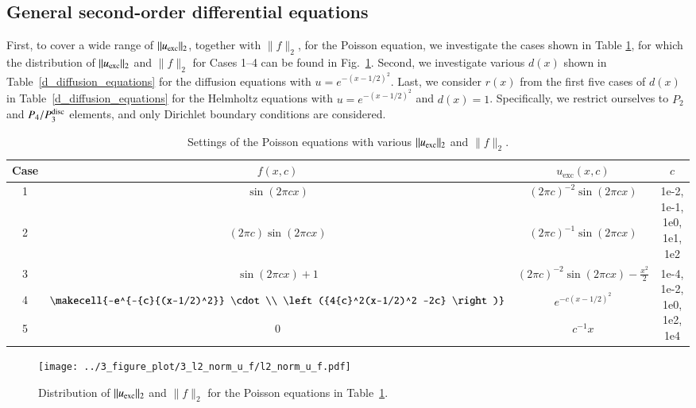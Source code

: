 \documentclass[review,3p]{elsarticle}
\begin{document}
\subsection{General second-order differential equations}	    \label{section_scaling}

First, to cover a wide range of $\|u_{\rm exc}\|_2$, together with $\|f\|_2$, for the Poisson equation, we investigate the cases shown in Table \ref{scaling_cases_Poisson}, for which the distribution of $\|u_{\rm exc}\|_2$ and $\|f\|_2$ for Cases 1--4 can be found in Fig.~\ref{l2_norm_u_f}. Second, we investigate various $d(x)$ shown in Table~\ref{d_diffusion_equations} for the diffusion equations with $u=e^{-{(x-1/2)^2}}$. Last, we consider $r(x)$ from the first five cases of $d(x)$ in Table~\ref{d_diffusion_equations} for the Helmholtz equations with $u=e^{-{(x-1/2)^2}}$ and $d(x)=1$. Specifically, we restrict ourselves to $P_2$ and $P_4/P_3^{\rm disc}$ elements, and only Dirichlet boundary conditions are considered. 

\begin{table}[!ht]
\centering
\caption [w]{Settings of the Poisson equations with various $\|u_{\rm exc}\|_2$ and $\|f\|_2$.} 
\label{scaling_cases_Poisson}
 \begin{tabular}{c c c c} \hline      
Case & $f(x,c)$ & $u_{\text{exc}}(x,c)$ & $c$ \\ \hline
1 & $\sin (2 \pi cx)$ & ${(2 \pi c)}^{-2} \sin (2 \pi cx)$ & \multirow{2}{*}{1e-2, 1e-1, 1e0, 1e1, 1e2} \\ \cline{1-3}
2 & $(2 \pi c) \sin (2 \pi c x)$ & ${(2 \pi c)}^{-1} \sin (2 \pi cx)$ &  \\ \hline
3 & $\sin (2 \pi c x) +1$ & ${(2 \pi c)}^{-2}\sin (2 \pi c x)-\frac{x^2}{2}$ & \multirow{4}{*}{1e-4, 1e-2, 1e0, 1e2, 1e4} \\ \cline{1-3}
4 & $\makecell{-e^{-{c}{(x-1/2)^2}} \cdot \\ \left({4{c}^2(x-1/2)^2 -2c} \right)}$ & $e^{-{c}{{(x-1/2)^2}}}$ &  \\ \cline{1-3}
5 & $0$ & ${c}^{-1} x$ &  \\ \hline
\end{tabular}
\end{table}

\begin{figure}[!ht]
\centering
    \texttt{[image: ../3\_figure\_plot/3\_l2\_norm\_u\_f/l2\_norm\_u\_f.pdf]}
    \caption{Distribution of $\|u_{\rm exc}\|_2$ and $\|f\|_2$ for the Poisson equations in Table~\ref{scaling_cases_Poisson}.}
    \label{l2_norm_u_f}
\end{figure}
\end{document}
